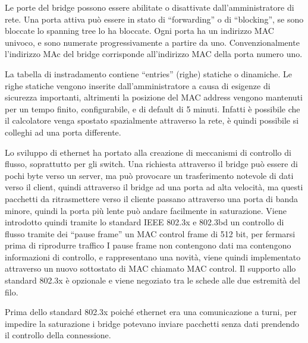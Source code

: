 \documentclass{article}
\numberwithin{equation}{subsection}
\begin{document}
Le porte del bridge possono essere abilitate o disattivate dall'amministratore di rete. Una porta attiva può essere in stato di ``forwarding'' o di ``blocking'', se sono 
bloccate lo spanning tree lo ha bloccate. Ogni porta ha un indirizzo MAC univoco, e sono numerate progressivamente a partire da uno. Convenzionalmente l'indirizzo MAc 
del bridge corrisponde all'indirizzo MAC della porta numero uno. 

La tabella di instradamento contiene ``entries'' (righe) statiche o dinamiche. Le righe statiche vengono inserite dall'amministratore a causa di esigenze di sicurezza 
importanti, altrimenti la posizione del MAC address vengono mantenuti per un tempo finito, configurabile, e di default di 5 minuti. Infatti è possibile che il calcolatore 
venga spostato spazialmente attraverso la rete, è quindi possibile si colleghi ad una porta differente. 


Lo sviluppo di ethernet ha portato alla creazione di meccanismi di controllo di flusso, soprattutto per gli switch. Una richiesta attraverso il bridge può essere di 
pochi byte verso un server, ma può provocare un trasferimento notevole di dati verso il client, quindi attraverso il bridge ad una porta ad alta velocità, ma questi 
pacchetti da ritrasmettere verso il cliente passano attraverso una porta di banda minore, quindi la porta più lente può andare facilmente in saturazione. 
Viene introdotto quindi tramite lo standard IEEE 802.3x e 802.3bd un controllo di flusso tramite dei ``pause frame'' un MAC control frame di 512 bit, per fermarsi 
prima di riprodurre traffico I pause frame non contengono dati ma contengono informazioni di controllo, e rappresentano una novità, viene quindi implementato 
attraverso un nuovo sottostato di MAC chiamato MAC control. Il supporto allo standard 802.3x è opzionale e viene negoziato tra le schede alle due estremità del filo. 

Prima dello standard 802.3x poiché ethernet era una comunicazione a turni, per impedire la saturazione i bridge potevano inviare pacchetti senza dati prendendo il 
controllo della connessione. 

\clearpage
\end{document}
